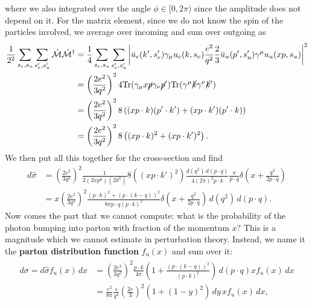 \documentclass[relqm.tex]{subfiles}
\begin{document}
where we also integrated over the angle $\phi\in[0,2\pi)$ since the amplitude does not depend on it.
For the matrix element, since we do not know the spin of the particles involved, we average over incoming and sum over outgoing as
\begin{align}
    \frac{1}{2^2}\sum_{s_e,s_u}\sum_{s_e',s_u'} \hat{\mathcal{M}}\hat{\mathcal{M}}^\dagger &= \frac14 \sum_{s_e,s_u}\sum_{s_e',s_u'} \bigg|\bar{u}_e(k',s_e')\gamma_\mu u_e(k,s_e)\frac{e^2}{q^2}\frac23 \bar{u}_u(p',s_u')\gamma^\mu u_u(xp,s_u)\bigg|^2 \\
                                                                                           &= \left(\frac{2e^2}{3q^2}\right)^2 4\text{Tr}(\gamma_\mu x\cancel{p}\gamma_\nu \cancel{p}')\text{Tr}(\gamma^\mu\cancel{k}\gamma^\nu\cancel{k}') \\
                                                                                           &= \left(\frac{2e^2}{3q^2}\right)^28\left((xp\cdot k)(p'\cdot k')+(xp\cdot k')(p'\cdot k)\right) \\
                                                                                           &= \left(\frac{2e^2}{3q^2}\right)^28\left((xp\cdot k)^2+(xp\cdot k')^2\right).
\end{align} 
We then put all this together for the cross-section and find
\begin{align}
    d\hat{\sigma} &= \left(\frac{2e^2}{3q^2}\right)^2\frac{1}{2(2xp^0)(2k^0)}8\left((xp\cdot k')^2\right) \frac{d(q^2)\,d(p\cdot q)}{4(2\pi)^2p\cdot k}\frac{\pi}{p\cdot q}\delta\left(x+\frac{q^2}{2p\cdot q}\right) \\
                  &= x\left(\frac{2e^2}{3q^2}\right)^2\frac{(p\cdot k)^2+(p\cdot(k-q))^2}{8\pi p\cdot q(p\cdot k)^2}\delta\left(x+\frac{q^2}{2p\cdot q}\right)\,d(q^2)\,d(p\cdot q).
\end{align}
Now comes the part that we cannot compute: what is the probability of the photon bumping into  parton with fraction of the momentum $x$?
This is a magnitude which we cannot estimate in perturbation theory. 
Instead, we name it the \textbf{parton distribution function} $f_u(x)$ and sum over it:
\begin{align}
    \begin{split}
        d\sigma = d\hat{\sigma}f_u(x)\,dx &= \left(\frac{2e^2}{3q^2}\right)^2\frac{p\cdot k}{4\pi}\left(1+\frac{\left(p\cdot(k-q)\right)^2}{(p\cdot k)^2}\right)\,d(p\cdot q)xf_u(x)\,dx \\
                                          &= \frac{e^2}{8\pi}\frac{s}{q^4}\left(\frac{2e}{3}\right)^2\left(1+(1-y)^2\right)\,dy\,xf_u(x)\,dx,
    \end{split}
\end{align}
\end{document}
